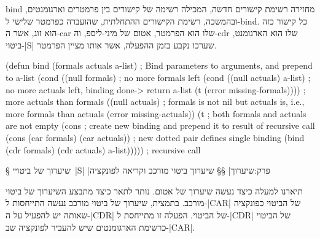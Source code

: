 bind מחזירה רשימת קישורים חדשה, המכילה רשימה של קישורים בין פרמטרים וארגומנטים,
ובהמשכה, רשימת הקישורים ההתחלתית, שהועברה כפרמטר שלישי ל-bind. כל קישור כזה הוא
זוג, אשר ה-car שלו הוא הפרמטר, אטום של מיני-ליספ, וה-cdr שלו הוא הארגומנט, ביטוי-\E|S|
שערכו נקבע בזמן ההפעלה, אשר אותו מציין הפרמטר.

\begin{KERNEL}
(defun bind (formals actuals a-list) ; Bind parameters to arguments, and prepend to a-list
  (cond ((null formals) ; no more formals left
        (cond ((null actuals) a-list) ; no more actuals left, binding done-> return a-list
              (t (error missing-formals)))) ; more actuals than formals
        ((null actuals) ; formals is not nil but actuals is, i.e., more formals than actuals
          (error missing-actuals))
        (t ; both formals and actuals are not empty
          (cons ; create new binding and prepend it to result of recursive call
            (cons (car formals) (car actuals)) ; new dotted pair defines single binding
            (bind (cdr formals) (cdr actuals) a-list))))) ; recursive call
\end{KERNEL}

§ שיערוך של ביטויי~\E|S|
|פרק:שיערוך|
§§ שיערוך ביטוי מורכב וקריאה לפונקציה

תיארנו למעלה כיצד נעשה שיערוך של אטום. נותר לתאר כיצד מתבצע השיערוך של ביטוי
מורכב. בתמצית, שיערוך של ביטוי מורכב נעשה התייחסות ל-\E|CAR| של הביטוי כפונקציה
שאותה יש להפעיל על ה-\E|CDR| של הביטוי. הפעלה זו מתייחסת ל-\E|CDR| של הביטוי
כרשימת הארגומנטים שיש להעביר לפונקציה שב-\E|CAR|.

